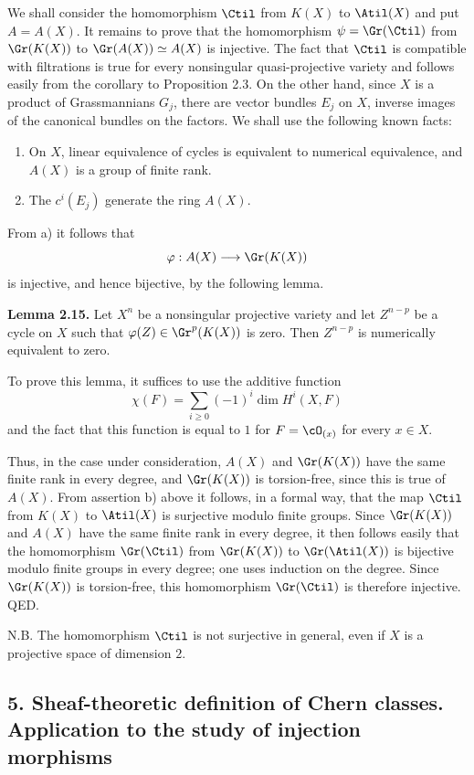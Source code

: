 We shall consider the homomorphism $\Ctil$ from $K(X)$ to $\Atil(X)$ and put $A=A(X)$. It remains to prove that the homomorphism $\psi=\Gr(\Ctil)$ from $\Gr(K(X))$ to $\Gr(A(X))\simeq A(X)$ is injective. The fact that $\Ctil$ is compatible with filtrations is true for every nonsingular quasi-projective variety and follows easily from the corollary to Proposition 2.3. On the other hand, since $X$ is a product of Grassmannians $G_j$, there are vector bundles $E_j$ on $X$, inverse images of the canonical bundles on the factors. We shall use the following known facts:
\begin{enumerate}[label=\alph*)]
\item On $X$, linear equivalence of cycles is equivalent to numerical equivalence, and $A(X)$ is a group of finite rank.
\item The $c^i(E_j)$ generate the ring $A(X)$.
\end{enumerate}
From a) it follows that
\[
 \varphi:A(X)\longrightarrow \Gr(K(X))
\]
is injective, and hence bijective, by the following lemma.

\textbf{Lemma 2.15.} Let $X^n$ be a nonsingular projective variety and let $Z^{n-p}$ be a cycle on $X$ such that $\varphi(Z)\in\Gr^p(K(X))$ is zero. Then $Z^{n-p}$ is numerically equivalent to zero.

To prove this lemma, it suffices to use the additive function
\[
 \chi(F)=\sum_{i\geq 0}(-1)^i\dim H^i(X,F)
\]
and the fact that this function is equal to $1$ for $F=\cO_{(x)}$ for every $x\in X$.

Thus, in the case under consideration, $A(X)$ and $\Gr(K(X))$ have the same finite rank in every degree, and $\Gr(K(X))$ is torsion-free, since this is true of $A(X)$. From assertion b) above it follows, in a formal way, that the map $\Ctil$ from $K(X)$ to $\Atil(X)$ is surjective modulo finite groups. Since $\Gr(K(X))$ and $A(X)$ have the same finite rank in every degree, it then follows easily that the homomorphism $\Gr(\Ctil)$ from $\Gr(K(X))$ to $\Gr(\Atil(X))$ is bijective modulo finite groups in every degree; one uses induction on the degree. Since $\Gr(K(X))$ is torsion-free, this homomorphism $\Gr(\Ctil)$ is therefore injective. QED.

N.B. The homomorphism $\Ctil$ is not surjective in general, even if $X$ is a projective space of dimension $2$.

\subsection*{5. Sheaf-theoretic definition of Chern classes. Application to the study of injection morphisms}

